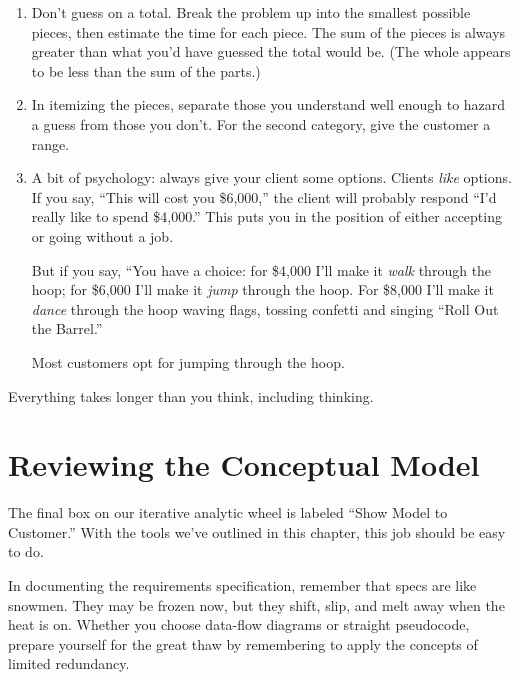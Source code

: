 \begin{enumerate}

\item Don't guess on a total. Break the problem up into the smallest
possible pieces, then estimate the time for each piece. The sum of the
pieces is always greater than what you'd have guessed the total would
be. (The whole appears to be less than the sum of the parts.)

\item In itemizing the pieces, separate those you understand well
enough to hazard a guess from those you don't. For the second
category, give the customer a range.

\item A bit of psychology: always give your client some options.
Clients \emph{like} options. If you say, ``This will cost you \$6,000,''
the client will probably respond ``I'd really like to spend \$4,000.''
This puts you in the position of either accepting or going without a job.

But if you say, ``You have a choice: for \$4,000 I'll make it
\emph{walk} through the hoop; for \$6,000 I'll make it \emph{jump}
through the hoop. For \$8,000 I'll make it \emph{dance} through the
hoop waving flags, tossing confetti and singing ``Roll Out the Barrel.''

Most customers opt for jumping through the hoop.
\end{enumerate}

\begin{tip}
Everything takes longer than you think, including thinking.
\end{tip}%
%
%
%

\section{Reviewing the Conceptual Model}%
%

The final box on our iterative analytic wheel is labeled ``Show Model
to Customer.'' With the tools we've outlined in this chapter, this job
should be easy to do.

In documenting the requirements specification, remember that specs are
like snowmen. They may be frozen now, but they shift, slip, and melt
away when the heat is on. Whether you choose data-flow diagrams or
straight \Forth{} pseudocode, prepare yourself for the great thaw by
remembering to apply the concepts of limited redundancy.

